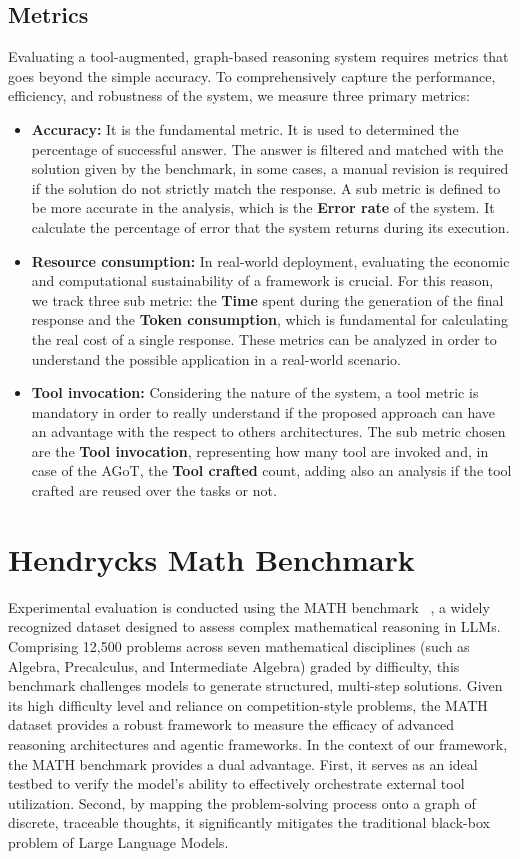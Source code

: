 \documentclass[12pt,a4paper,openright,twoside]{book}
\begin{document}
\subsection{Metrics}
Evaluating a tool-augmented, graph-based reasoning system requires metrics that goes beyond the simple accuracy.
To comprehensively capture the performance, efficiency, and robustness of the system, we measure three primary metrics:
\begin{itemize}
    \item \textbf{Accuracy:} It is the fundamental metric. It is used to determined the percentage of successful answer. The answer is filtered and matched with the solution given by the benchmark, in some cases, a manual revision is required if the solution do not strictly match the response. A sub metric is defined to be more accurate in the analysis, which is the \textbf{Error rate} of the system. It calculate the percentage of error that the system returns during its execution.
    \item \textbf{Resource consumption:} In real-world deployment, evaluating the economic and computational sustainability of a framework is crucial. For this reason, we track three sub metric: the \textbf{Time} spent during the generation of the final response and the \textbf{Token consumption}, which is fundamental for calculating the real cost of a single response. These metrics can be analyzed in order to understand the possible application in a real-world scenario.
    \item \textbf{Tool invocation:} Considering the nature of the system, a tool metric is mandatory in order to really understand if the proposed approach can have an advantage with the respect to others architectures. The sub metric chosen are the \textbf{Tool invocation}, representing how many tool are invoked and, in case of the \ac{AGoT}, the \textbf{Tool crafted} count, adding also an analysis if the tool crafted are reused over the tasks or not.
\end{itemize}

\section{Hendrycks Math Benchmark}
Experimental evaluation is conducted using the MATH benchmark ~\cite{hendrycksmath2021}, a widely recognized dataset designed to assess complex mathematical reasoning in LLMs. Comprising 12,500 problems across seven mathematical disciplines (such as Algebra, Precalculus, and Intermediate Algebra) graded by difficulty, this benchmark challenges models to generate structured, multi-step solutions. Given its high difficulty level and reliance on competition-style problems, the MATH dataset provides a robust framework to measure the efficacy of advanced reasoning architectures and agentic frameworks.
In the context of our framework, the MATH benchmark provides a dual advantage. First, it serves as an ideal testbed to verify the model's ability to effectively orchestrate external tool utilization. Second, by mapping the problem-solving process onto a graph of discrete, traceable thoughts, it significantly mitigates the traditional black-box problem of Large Language Models.
\end{document}
